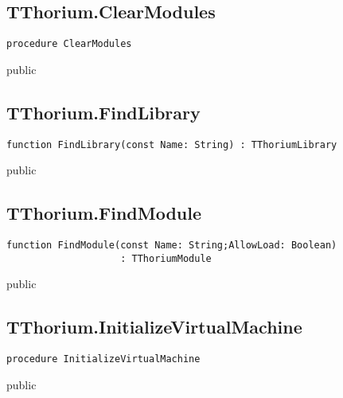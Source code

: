 \subsection{TThorium.ClearModules}
\label{thoriumcore:thorium:tthorium:clearmodules}
\begin{FPCList}
\Synopsis
\Declaration 

\begin{verbatim}
procedure ClearModules
\end{verbatim}
\Visibility
public
\Description
\Errors
\end{FPCList}
\subsection{TThorium.FindLibrary}
\label{thoriumcore:thorium:tthorium:findlibrary}
\begin{FPCList}
\Synopsis
\Declaration 

\begin{verbatim}
function FindLibrary(const Name: String) : TThoriumLibrary
\end{verbatim}
\Visibility
public
\Description
\Errors
\end{FPCList}
\subsection{TThorium.FindModule}
\label{thoriumcore:thorium:tthorium:findmodule}
\begin{FPCList}
\Synopsis
\Declaration 

\begin{verbatim}
function FindModule(const Name: String;AllowLoad: Boolean)
                    : TThoriumModule
\end{verbatim}
\Visibility
public
\Description
\Errors
\end{FPCList}
\subsection{TThorium.InitializeVirtualMachine}
\label{thoriumcore:thorium:tthorium:initializevirtualmachine}
\begin{FPCList}
\Synopsis
\Declaration 

\begin{verbatim}
procedure InitializeVirtualMachine
\end{verbatim}
\Visibility
public
\Description
\Errors
\end{FPCList}
